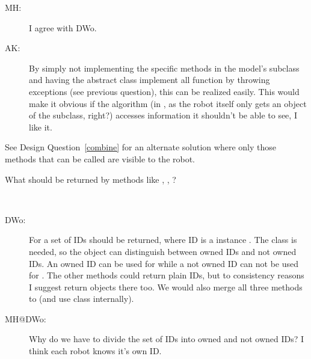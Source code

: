 \begin{appendix}
\begin{resolution}
\begin{description}
	\item [MH:] I agree with DWo.
	
	\item [AK:] By simply not implementing the specific methods in the model's  subclass and having the abstract  class implement all function by throwing exceptions (see previous question), this can be realized easily. This would make it obvious if the algorithm (in , as the robot itself only gets an object of the subclass, right?) accesses information it shouldn't be able to see, I like it.
\end{description}
See Design Question~\ref{combine} for an alternate solution where only those methods that can be called are visible to the robot.
\end{resolution}

\begin{designQuestion}
	What should be returned by methods like , , ?
\end{designQuestion}
\begin{resolution}~
\begin{description}
	\item [DWo:] For  a set of IDs should be returned, where ID is a instance . The class is needed, so the  object can distinguish between owned IDs and not owned IDs. An owned ID can be used for  while a not owned ID can not be used for . The other methods could return plain IDs, but to consistency reasons I suggest return objects there too. We would also merge all three methods to  (and use  class internally).
	
	\item [MH@DWo:] Why do we have to divide the set of IDs into owned and not owned IDs? I think each robot knows it's own ID.
	

\end{description}
\end{resolution}
\end{appendix}
